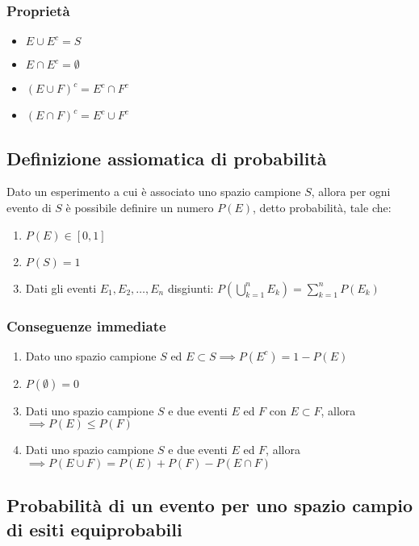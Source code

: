 \documentclass{subfiles}
\begin{document}
\subsubsection{Proprietà}

\begin{itemize}
    \item $E \cup E^c = S$
    \item $E \cap E^c = \emptyset$
    \item $(E \cup F)^c = E^c \cap F^c$
    \item $(E \cap F)^c = E^c \cup F^c$
\end{itemize}

\subsection{Definizione assiomatica di probabilità}

Dato un esperimento a cui è associato uno spazio campione $S$, allora per ogni evento di $S$ è possibile definire un numero $P(E)$, detto probabilità, tale che:

\begin{enumerate}
    \item $P(E) \in [0,1]$
    \item $P(S) = 1$
    \item Dati gli eventi $E_1, E_2, \dots, E_n$ disgiunti: $P(\bigcup^n_{k=1} E_k) = \sum^n_{k=1} P(E_k)$
\end{enumerate}

\subsubsection{Conseguenze immediate}

\begin{enumerate}
    \item Dato uno spazio campione $S$ ed $E \subset S \implies P(E^c) = 1 - P(E)$
    \item $P(\emptyset) = 0$
    \item Dati uno spazio campione $S$ e due eventi $E$ ed $F$ con $E \subset F$, allora $\implies P(E) \leq P(F)$
    \item Dati uno spazio campione $S$ e due eventi $E$ ed $F$, allora $\implies P(E \cup F) = P(E) + P(F) - P(E \cap F)$
\end{enumerate}

\subsection{Probabilità di un evento per uno spazio campio di esiti equiprobabili}
\end{document}
